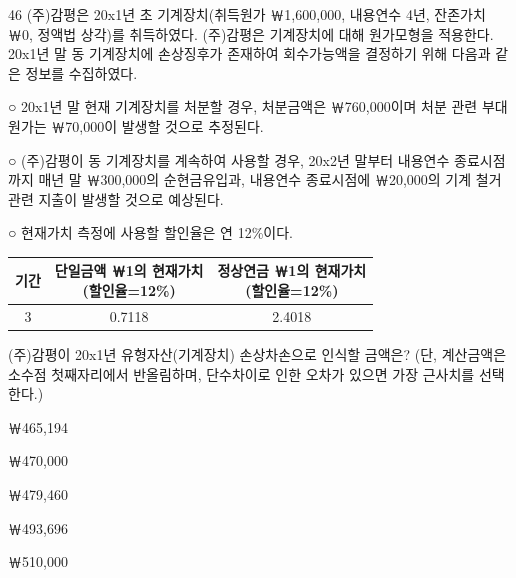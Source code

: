 \begin{question}{46}
(주)감평은 20x1년 초 기계장치(취득원가 ￦1,600,000, 내용연수 4년, 잔존가치 ￦0, 정액법 상각)를 취득하였다. (주)감평은 기계장치에 대해 원가모형을 적용한다. 20x1년 말 동 기계장치에 손상징후가 존재하여 회수가능액을 결정하기 위해 다음과 같은 정보를 수집하였다.
\begin{framedtext}
○ 20x1년 말 현재 기계장치를 처분할 경우, 처분금액은 ￦760,000이며 처분 관련 부대원가는 ￦70,000이 발생할 것으로 추정된다. \par
○ (주)감평이 동 기계장치를 계속하여 사용할 경우, 20x2년 말부터 내용연수 종료시점까지 매년 말 ￦300,000의 순현금유입과, 내용연수 종료시점에 ￦20,000의 기계 철거 관련 지출이 발생할 것으로 예상된다. \par
○ 현재가치 측정에 사용할 할인율은 연 12\%이다. \par
\par{\small\centering\begin{tabular}{|c|c|c|}\hline
기간 & \makecell{단일금액 ￦1의 현재가치\\(할인율=12\%)} & \makecell{정상연금 ￦1의 현재가치\\(할인율=12\%)} \\ \hline
3 & 0.7118 & 2.4018 \\ \hline
\end{tabular}\par}
\end{framedtext}
(주)감평이 20x1년 유형자산(기계장치) 손상차손으로 인식할 금액은? (단, 계산금액은 소수점 첫째자리에서 반올림하며, 단수차이로 인한 오차가 있으면 가장 근사치를 선택한다.)
\begin{choices}
  \item ￦465,194
  \item ￦470,000
  \item ￦479,460
  \item ￦493,696
  \item ￦510,000
\end{choices}
\end{question}
